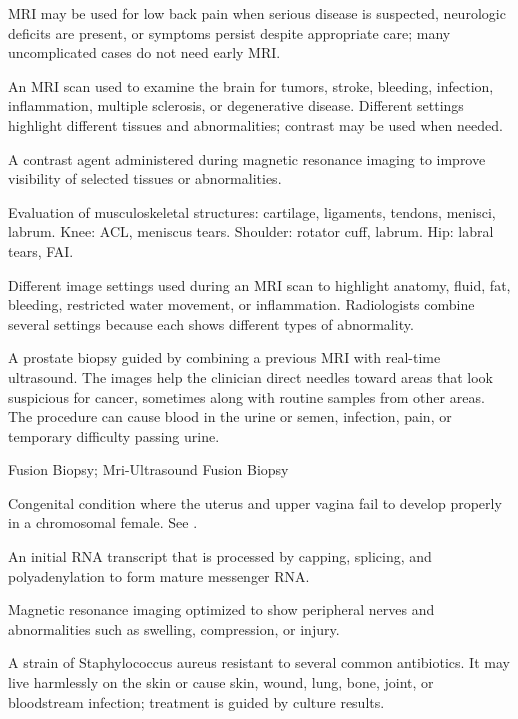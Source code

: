  MRI may be used for low back pain when serious disease is suspected, neurologic deficits are present, or symptoms persist despite appropriate care; many uncomplicated cases do not need early MRI.

 An MRI scan used to examine the brain for tumors, stroke, bleeding, infection, inflammation, multiple sclerosis, or degenerative disease. Different settings highlight different tissues and abnormalities; contrast may be used when needed.

 A contrast agent administered during magnetic resonance imaging to improve visibility of selected tissues or abnormalities.

 Evaluation of musculoskeletal structures: cartilage, ligaments, tendons, menisci,
labrum. Knee: ACL, meniscus tears. Shoulder: rotator cuff, labrum. Hip: labral tears,
FAI.

 Different image settings used during an MRI scan to highlight anatomy, fluid, fat, bleeding, restricted water movement, or inflammation. Radiologists combine several settings because each shows different types of abnormality.

 A prostate biopsy guided by combining a previous MRI with real-time ultrasound. The images help the clinician direct needles toward areas that look suspicious for cancer, sometimes along with routine samples from other areas. The procedure can cause blood in the urine or semen, infection, pain, or temporary difficulty passing urine.

\synonyms
Fusion Biopsy; Mri-Ultrasound Fusion Biopsy

 Congenital condition where the uterus and upper vagina fail to develop properly in a chromosomal female. See .

 An initial RNA transcript that is processed by capping, splicing, and polyadenylation to form mature messenger RNA.

 Magnetic resonance imaging optimized to show peripheral nerves and abnormalities such as swelling, compression, or injury.

 A strain of Staphylococcus aureus resistant to several common antibiotics. It may live harmlessly on the skin or cause skin, wound, lung, bone, joint, or bloodstream infection; treatment is guided by culture results.

